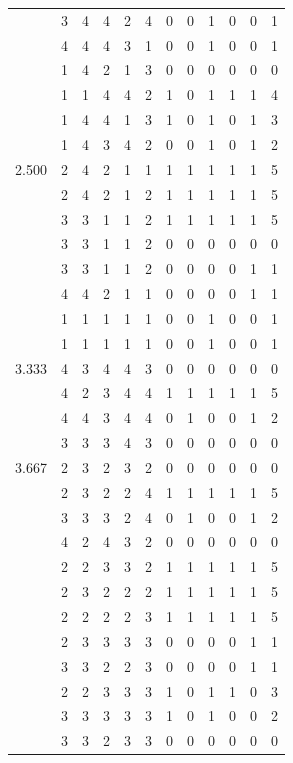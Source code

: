 \documentclass[]{msu-thesis}
\theoremstyle{definition}
\theoremstyle{definition}
\theoremstyle{definition}
\theoremstyle{remark}
\begin{document}
\begin{table}
{\begin{tabular}[t]{rrrrrrrrrrrr}
 & 3 & 4 & 4 & 2 & 4 & 0 & 0 & 1 & 0 & 0 & 1\\
 & 4 & 4 & 4 & 3 & 1 & 0 & 0 & 1 & 0 & 0 & 1\\
 & 1 & 4 & 2 & 1 & 3 & 0 & 0 & 0 & 0 & 0 & 0\\
 & 1 & 1 & 4 & 4 & 2 & 1 & 0 & 1 & 1 & 1 & 4\\
 & 1 & 4 & 4 & 1 & 3 & 1 & 0 & 1 & 0 & 1 & 3\\
 & 1 & 4 & 3 & 4 & 2 & 0 & 0 & 1 & 0 & 1 & 2\\
2.500 & 2 & 4 & 2 & 1 & 1 & 1 & 1 & 1 & 1 & 1 & 5\\
 & 2 & 4 & 2 & 1 & 2 & 1 & 1 & 1 & 1 & 1 & 5\\
 & 3 & 3 & 1 & 1 & 2 & 1 & 1 & 1 & 1 & 1 & 5\\
 & 3 & 3 & 1 & 1 & 2 & 0 & 0 & 0 & 0 & 0 & 0\\
 & 3 & 3 & 1 & 1 & 2 & 0 & 0 & 0 & 0 & 1 & 1\\
 & 4 & 4 & 2 & 1 & 1 & 0 & 0 & 0 & 0 & 1 & 1\\
 & 1 & 1 & 1 & 1 & 1 & 0 & 0 & 1 & 0 & 0 & 1\\
 & 1 & 1 & 1 & 1 & 1 & 0 & 0 & 1 & 0 & 0 & 1\\
3.333 & 4 & 3 & 4 & 4 & 3 & 0 & 0 & 0 & 0 & 0 & 0\\
 & 4 & 2 & 3 & 4 & 4 & 1 & 1 & 1 & 1 & 1 & 5\\
 & 4 & 4 & 3 & 4 & 4 & 0 & 1 & 0 & 0 & 1 & 2\\
 & 3 & 3 & 3 & 4 & 3 & 0 & 0 & 0 & 0 & 0 & 0\\
3.667 & 2 & 3 & 2 & 3 & 2 & 0 & 0 & 0 & 0 & 0 & 0\\
 & 2 & 3 & 2 & 2 & 4 & 1 & 1 & 1 & 1 & 1 & 5\\
 & 3 & 3 & 3 & 2 & 4 & 0 & 1 & 0 & 0 & 1 & 2\\
 & 4 & 2 & 4 & 3 & 2 & 0 & 0 & 0 & 0 & 0 & 0\\
 & 2 & 2 & 3 & 3 & 2 & 1 & 1 & 1 & 1 & 1 & 5\\
 & 2 & 3 & 2 & 2 & 2 & 1 & 1 & 1 & 1 & 1 & 5\\
 & 2 & 2 & 2 & 2 & 3 & 1 & 1 & 1 & 1 & 1 & 5\\
 & 2 & 3 & 3 & 3 & 3 & 0 & 0 & 0 & 0 & 1 & 1\\
 & 3 & 3 & 2 & 2 & 3 & 0 & 0 & 0 & 0 & 1 & 1\\
 & 2 & 2 & 3 & 3 & 3 & 1 & 0 & 1 & 1 & 0 & 3\\
 & 3 & 3 & 3 & 3 & 3 & 1 & 0 & 1 & 0 & 0 & 2\\
 & 3 & 3 & 2 & 3 & 3 & 0 & 0 & 0 & 0 & 0 & 0\\

\end{tabular}}
\end{table}
\end{document}
